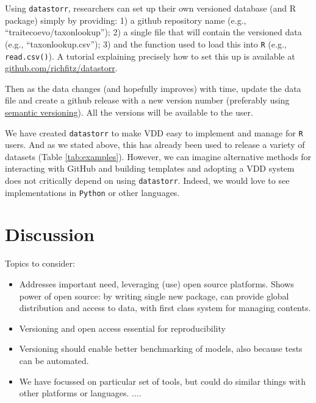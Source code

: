 \documentclass[a4paper,11pt]{article}
\newcommand{\smurl}[1]{{\footnotesize\url{#1}}}
\begin{document}
Using \texttt{datastorr}, researchers can set up their own versioned database (and R package) simply by providing: 1) a github repository name (e.g., ``traitecoevo/taxonlookup''); 2) a single file that will contain the versioned data (e.g., ``taxonlookup.csv''); 3) and the function used to load this into \texttt{R} (e.g., \texttt{read.csv()}). A tutorial explaining precisely how to set this up is available at \smurl{github.com/richfitz/datastorr}. %

Then as the data changes (and hopefully improves) with time, update the data
file and create a github release with a new version number (preferably
using \href{http://semver.org/}{semantic versioning}). All the versions
will be available to the user. 

We have created \texttt{datastorr} to make VDD easy to implement and manage for \texttt{R} users. And as we stated above, this has already been used to release a variety of datasets (Table \ref{tab:examples}). However, we can imagine alternative methods for interacting with GitHub and building templates and adopting a VDD system does not critically depend on using \texttt{datastorr}. Indeed, we would love to see implementations in \texttt{Python} or other languages.

\section{Discussion}

Topics to consider:

\begin{itemize}

\item Addresses important need, leveraging (use) open source platforms. Shows power of open source: by writing single new package, can provide global distribution and access to data, with first class system for managing contents.
\item Versioning and open access essential for reproducibility
\item Versioning should enable better benchmarking of models, also because tests can be automated.
\item We have focussed on particular set of tools, but could do similar things with other platforms or languages.
....
\end{itemize}
\end{document}
